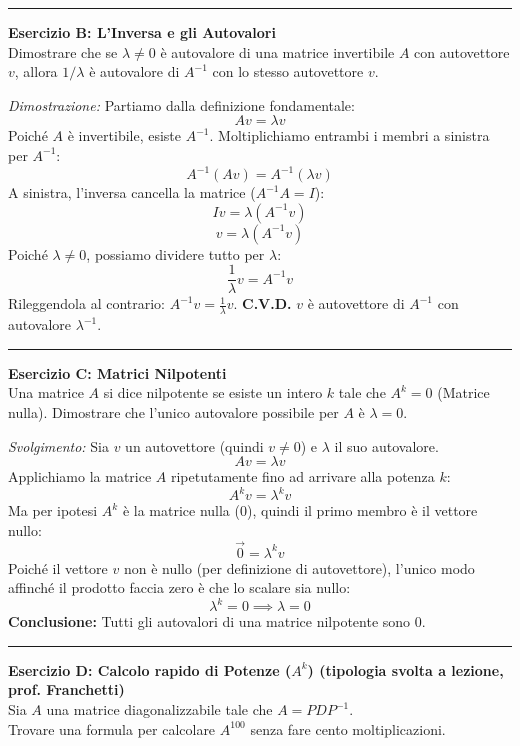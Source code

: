 \documentclass[10pt,a4paper]{article}
\begin{document}
\vspace{0.4cm}
\hrule
\vspace{0.4cm}

\textbf{Esercizio B: L'Inversa e gli Autovalori}
\\ Dimostrare che se $\lambda \neq 0$ è autovalore di una matrice invertibile $A$ con autovettore $v$, allora $1/\lambda$ è autovalore di $A^{-1}$ con lo stesso autovettore $v$.

\textit{Dimostrazione:}
Partiamo dalla definizione fondamentale:
\[ A v = \lambda v \]
Poiché $A$ è invertibile, esiste $A^{-1}$. Moltiplichiamo entrambi i membri a sinistra per $A^{-1}$:
\[ A^{-1} (A v) = A^{-1} (\lambda v) \]
A sinistra, l'inversa cancella la matrice ($A^{-1}A = I$):
\[ I v = \lambda (A^{-1} v) \]
\[ v = \lambda (A^{-1} v) \]
Poiché $\lambda \neq 0$, possiamo dividere tutto per $\lambda$:
\[ \frac{1}{\lambda} v = A^{-1} v \]
Rileggendola al contrario: $A^{-1} v = \frac{1}{\lambda} v$.
\textbf{C.V.D.} $v$ è autovettore di $A^{-1}$ con autovalore $\lambda^{-1}$.

\vspace{0.4cm}
\hrule
\vspace{0.4cm}

\textbf{Esercizio C: Matrici Nilpotenti}
\\ Una matrice $A$ si dice nilpotente se esiste un intero $k$ tale che $A^k = 0$ (Matrice nulla). Dimostrare che l'unico autovalore possibile per $A$ è $\lambda = 0$.

\textit{Svolgimento:}
Sia $v$ un autovettore (quindi $v \neq 0$) e $\lambda$ il suo autovalore.
\[ A v = \lambda v \]
Applichiamo la matrice $A$ ripetutamente fino ad arrivare alla potenza $k$:
\[ A^k v = \lambda^k v \]
Ma per ipotesi $A^k$ è la matrice nulla ($0$), quindi il primo membro è il vettore nullo:
\[ \vec{0} = \lambda^k v \]
Poiché il vettore $v$ non è nullo (per definizione di autovettore), l'unico modo affinché il prodotto faccia zero è che lo scalare sia nullo:
\[ \lambda^k = 0 \implies \lambda = 0 \]
\textbf{Conclusione:} Tutti gli autovalori di una matrice nilpotente sono 0.

\vspace{0.4cm}
\hrule
\vspace{0.4cm}

\textbf{Esercizio D: Calcolo rapido di Potenze ($A^k$) (tipologia svolta a lezione, prof. Franchetti)}
\\ Sia $A$ una matrice diagonalizzabile tale che $A = P D P^{-1}$.
\\ Trovare una formula per calcolare $A^{100}$ senza fare cento moltiplicazioni.
\end{document}
